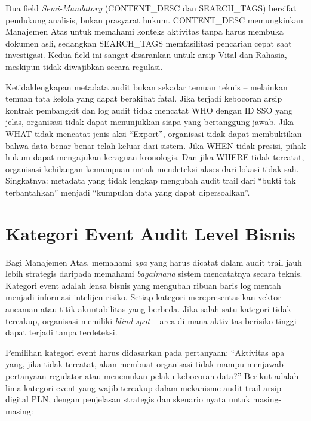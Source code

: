 \documentclass[12pt,a4paper]{report}
\begin{document}
Dua field \textit{Semi-Mandatory} (CONTENT\_DESC dan SEARCH\_TAGS) bersifat pendukung analisis, bukan prasyarat hukum. CONTENT\_DESC memungkinkan Manajemen Atas untuk memahami konteks aktivitas tanpa harus membuka dokumen asli, sedangkan SEARCH\_TAGS memfasilitasi pencarian cepat saat investigasi. Kedua field ini sangat disarankan untuk arsip Vital dan Rahasia, meskipun tidak diwajibkan secara regulasi.

\begin{plnbox}
Ketidaklengkapan metadata audit bukan sekadar temuan teknis -- melainkan temuan tata kelola yang dapat berakibat fatal. Jika terjadi kebocoran arsip kontrak pembangkit dan log audit tidak mencatat WHO dengan ID SSO yang jelas, organisasi tidak dapat menunjukkan siapa yang bertanggung jawab. Jika WHAT tidak mencatat jenis aksi ``Export'', organisasi tidak dapat membuktikan bahwa data benar-benar telah keluar dari sistem. Jika WHEN tidak presisi, pihak hukum dapat mengajukan keraguan kronologis. Dan jika WHERE tidak tercatat, organisasi kehilangan kemampuan untuk mendeteksi akses dari lokasi tidak sah. Singkatnya: metadata yang tidak lengkap mengubah audit trail dari ``bukti tak terbantahkan'' menjadi ``kumpulan data yang dapat dipersoalkan''.
\end{plnbox}


\section{Kategori Event Audit Level Bisnis}
Bagi Manajemen Atas, memahami \textit{apa} yang harus dicatat dalam audit trail jauh lebih strategis daripada memahami \textit{bagaimana} sistem mencatatnya secara teknis. Kategori event adalah lensa bisnis yang mengubah ribuan baris log mentah menjadi informasi intelijen risiko. Setiap kategori merepresentasikan vektor ancaman atau titik akuntabilitas yang berbeda. Jika salah satu kategori tidak tercakup, organisasi memiliki \textit{blind spot} -- area di mana aktivitas berisiko tinggi dapat terjadi tanpa terdeteksi.

Pemilihan kategori event harus didasarkan pada pertanyaan: ``Aktivitas apa yang, jika tidak tercatat, akan membuat organisasi tidak mampu menjawab pertanyaan regulator atau menemukan pelaku kebocoran data?'' Berikut adalah lima kategori event yang wajib tercakup dalam mekanisme audit trail arsip digital PLN, dengan penjelasan strategis dan skenario nyata untuk masing-masing:
\end{document}
